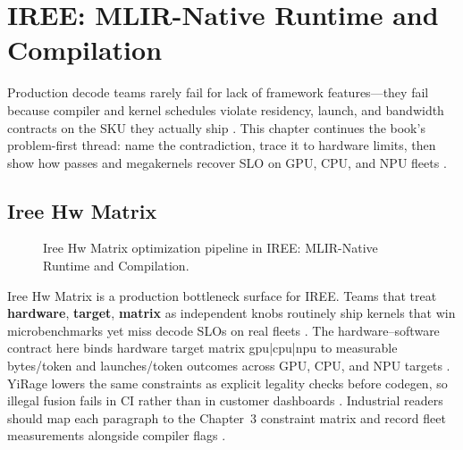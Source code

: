 \chapter{IREE: MLIR-Native Runtime and Compilation}
\label{chap:ch18}

Production decode teams rarely fail for lack of framework features---they fail because compiler and kernel schedules violate residency, launch, and bandwidth contracts on the SKU they actually ship \citep{patel2025llminference,nvidia2022hopper}. This chapter continues the book's problem-first thread: name the contradiction, trace it to hardware limits, then show how passes and megakernels recover SLO on GPU, CPU, and NPU fleets \citep{taxbreak2026,semianalysis2024tma}.

\section{Iree Hw Matrix}
\label{sec:iree_hw_matrix}
\begin{figure}[t]
\centering
{}
\caption{Iree Hw Matrix optimization pipeline in IREE: MLIR-Native Runtime and Compilation.}
\label{fig:iree_hw_matrix_pipeline}
\end{figure}


Iree Hw Matrix is a production bottleneck surface for IREE. Teams that treat \textbf{hardware}, \textbf{target}, \textbf{matrix} as independent knobs routinely ship kernels that win microbenchmarks yet miss decode SLOs on real fleets \citep{patel2025llminference,nvidia2022hopper}. The hardware--software contract here binds hardware target matrix gpu|cpu|npu to measurable bytes/token and launches/token outcomes across GPU, CPU, and NPU targets \citep{taxbreak2026,semianalysis2024tma}. YiRage lowers the same constraints as explicit legality checks before codegen, so illegal fusion fails in CI rather than in customer dashboards \citep{memoryfloor2026,amd2024xdna}. Industrial readers should map each paragraph to the Chapter~3 constraint matrix and record fleet measurements alongside compiler flags \citep{nvidia2022hopper,amd2024aie}.

